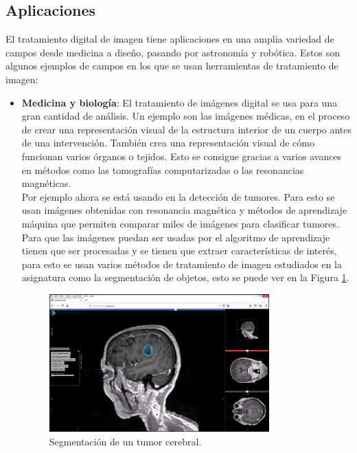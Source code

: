 \subsection{Aplicaciones}
El tratamiento digital de imagen tiene aplicaciones en una amplia variedad de campos desde medicina a diseño, pasando por astronomía y robótica\cite{Usos}.  Estos son algunos ejemplos de campos en los que se usan herramientas de tratamiento de imagen:
\begin{itemize}
\item \textbf{Medicina y biología}: El tratamiento de imágenes digital se usa para una gran cantidad de análisis. Un ejemplo son las imágenes médicas, en el proceso de crear una representación visual de la estructura interior de un cuerpo antes de una intervención. También crea una representación visual de cómo funcionan varios órganos o tejidos. Esto se consigue gracias a varios avances en métodos como las tomografías computarizadas o las resonancias magnéticas.\\

Por ejemplo ahora se está usando en la detección de tumores\cite{Tumores}. Para esto se usan imágenes obtenidas con resonancia magnética y métodos de aprendizaje máquina que permiten comparar miles de imágenes para clasificar tumores. Para que las imágenes puedan ser usadas por el algoritmo de aprendizaje tienen que ser procesadas y se tienen que extraer características de interés, para esto se usan varios métodos de tratamiento de imagen estudiados en la asignatura como la segmentación de objetos, esto se puede ver en la Figura \ref{tumores}.\\

\begin{figure}[h]
\centering
\includegraphics[width=0.8\textwidth]{imagenes/tumores.png}
\caption{Segmentación de un tumor cerebral.}
\label{tumores}
\end{figure}


\end{itemize}
